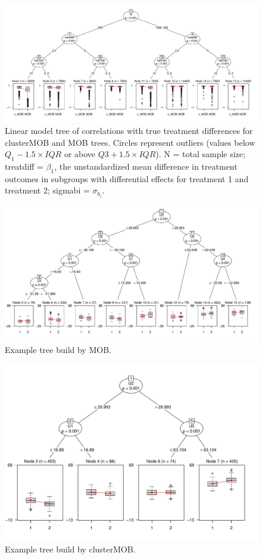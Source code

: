 \documentclass[nobf,man]{apa}
\begin{document}
\begin{figure}
	\includegraphics[width=20cm]{correlation_mob_maxdepth=4.pdf}
	\caption{Linear model tree of correlations with true treatment differences for clusterMOB and MOB trees. Circles represent outliers (values below $Q_1 - 1.5 \times IQR$ or above $Q3 + 1.5 \times IQR$). N = total sample size; treatdiff = $\beta_1$, the unstandardized mean difference in treatment outcomes in subgroups with differential effects for treatment 1 and treatment 2; sigmabi = $\sigma_{b_i}$.}
	\label{fig:correlationtree}
\end{figure}


\begin{figure}
    \includegraphics[width=20cm]{Mobtree1218.pdf}
	\caption{Example tree build by MOB.}
	\label{fig:exampleMob}
\end{figure}


\begin{figure}
    \includegraphics[width=12cm]{REEMobtree1218.pdf}
	\caption{Example tree build by clusterMOB.}
	\label{fig:exampleREEMob}
\end{figure}
\end{document}
